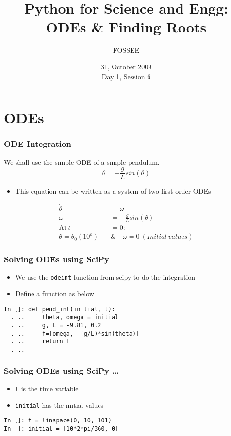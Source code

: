 \documentclass[14pt,compress]{beamer}
\title[ODEs \& Root Finding]{Python for Science and Engg:\\ODEs \& Finding Roots}
\author[FOSSEE] {FOSSEE}
\institute[IIT Bombay] {Department of Aerospace Engineering\\IIT Bombay}
\date[] {31, October 2009\\Day 1, Session 6}
\newcounter{time}
\newcommand{\typ}[1]{\lstinline{#1}}
\begin{document}
\begin{frame}
  \maketitle
\end{frame}


\section{ODEs}

\begin{frame}[fragile]
\frametitle{ODE Integration}
We shall use the simple ODE of a simple pendulum. 
\begin{equation*}
\ddot{\theta} = -\frac{g}{L}sin(\theta)
\end{equation*}
\begin{itemize}
\item This equation can be written as a system of two first order ODEs
\end{itemize}
\begin{align}
\dot{\theta} &= \omega \\
\dot{\omega} &= -\frac{g}{L}sin(\theta) \\
 \text{At}\ t &= 0 : \nonumber \\
 \theta = \theta_0(10^o)\quad & \&\quad  \omega = 0\ (Initial\ values)\nonumber 
\end{align}
\end{frame}

\begin{frame}[fragile]
\frametitle{Solving ODEs using SciPy}
\begin{itemize}
\item We use the \typ{odeint} function from scipy to do the integration
\item Define a function as below
\end{itemize}
\begin{lstlisting}
In []: def pend_int(initial, t):
  ....     theta, omega = initial
  ....     g, L = -9.81, 0.2
  ....     f=[omega, -(g/L)*sin(theta)]
  ....     return f
  ....
\end{lstlisting}
\end{frame}

\begin{frame}[fragile]
\frametitle{Solving ODEs using SciPy \ldots}
\begin{itemize}
\item \typ{t} is the time variable \\ 
\item \typ{initial} has the initial values
\end{itemize}
\begin{lstlisting}
In []: t = linspace(0, 10, 101)
In []: initial = [10*2*pi/360, 0]
\end{lstlisting} 
\end{frame}
\end{document}
